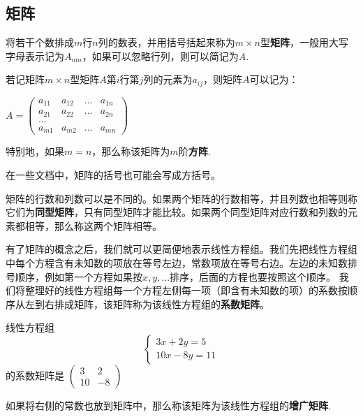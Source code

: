 \subsection{矩阵}
\begin{definition}
    将若干个数排成$m$行$n$列的数表，并用括号括起来称为$m \times n$型\textbf{矩阵}，一般用大写字母表示记为$A_{mn}$，如果可以忽略行列，则可以简记为$A$.
    
    若记矩阵$m \times n$型矩阵$A$第$i$行第$j$列的元素为$a_{ij}$，则矩阵$A$可以记为：

    $A=\begin{pmatrix} a_{11} & a_{12} & ... & a_{1n} \\ a_{21} & a_{22} & ... & a_{2n} \\ ...  \\ a_{m1} & a_{m2} & ... &a_{mn} \end{pmatrix}$

    特别地，如果$m=n$，那么称该矩阵为$m$阶\textbf{方阵}.
\end{definition}

在一些文档中，矩阵的括号也可能会写成方括号。

矩阵的行数和列数可以是不同的。如果两个矩阵的行数相等，并且列数也相等则称它们为\textbf{同型矩阵}，只有同型矩阵才能比较。如果两个同型矩阵对应行数和列数的元素都相等，那么称这两个矩阵相等。

有了矩阵的概念之后，我们就可以更简便地表示线性方程组。我们先把线性方程组中每个方程含有未知数的项放在等号左边，常数项放在等号右边。左边的未知数排号顺序，例如第一个方程如果按$x,y,...$排序，后面的方程也要按照这个顺序。
我们将整理好的线性方程组每一个方程左侧每一项（即含有未知数的项）的系数按顺序从左到右排成矩阵，该矩阵称为该线性方程组的\textbf{系数矩阵}。

\begin{example}
    线性方程组
    \begin{equation}
        \begin{cases}
            3x+2y=5 \\
            10x-8y=11
        \end{cases}
    \end{equation}
    的系数矩阵是
    $\begin{pmatrix}
        3 & 2 \\ 10 & -8
    \end{pmatrix}$    
\end{example}

如果将右侧的常数也放到矩阵中，那么称该矩阵为该线性方程组的\textbf{增广矩阵}.

